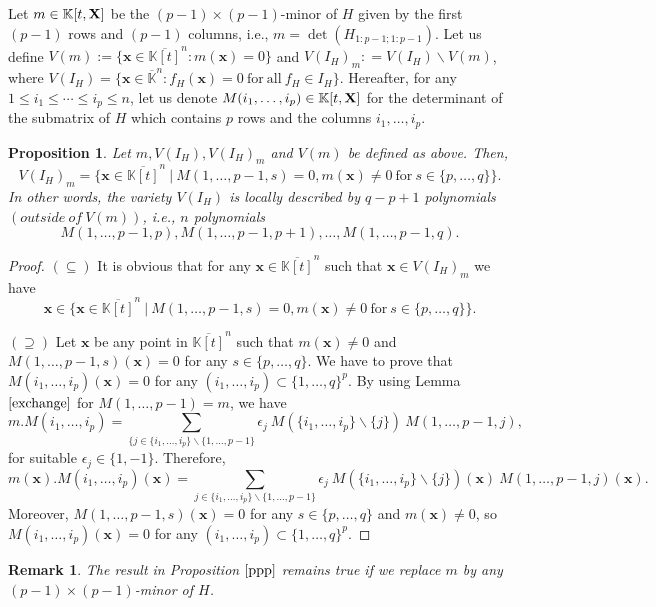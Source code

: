 \documentclass[11pt]{article}
\numberwithin{Property}{section}
\numberwithin{Theorem}{section}
\newtheorem{Proposition}{Proposition}%
\numberwithin{Proposition}{section}
\numberwithin{Lemma}{section}
\numberwithin{Corollary}{section}
\numberwithin{Definition}{section}
\newtheorem{Remark}{Remark}%
\numberwithin{Remark}{section}
\numberwithin{Conjecture}{section}
\numberwithin{Problem}{section}
\numberwithin{Example}{section}
\numberwithin{Claim}{section}
\renewcommand{\leq}{\leqslant}
\def\bar{\overline}
\newcommand{\field}{\mathbb{K}} %
\newcommand{\mat}[1]{\mathbf{\MakeUppercase{#1}}} %
\begin{document}
Let $m \in \field[t,\mat{X}]$ be the $(p-1) \times (p-1)$-minor of $H$ given by the first $(p-1)$ rows and $(p-1)$ columns, i.e., $m = \det(H_{1:p-1;1:p-1})$. Let us define $V(m) := \{\mathbf{x} \in \bar{\field[t]}^n : m(\mathbf{x}) = 0\}$ and $V(I_H)_m : = V(I_H) \backslash V(m)$, where $V(I_H) = \{\mathbf{x} \in \bar{\field}^{n} : f_H(\mathbf{x}) = 0 \ \mathrm{for \ all} \ f_H \in I_H\}$. Hereafter, for any $1 \leq i_1 \leq \cdots \leq i_p \leq n$, let us denote $M(i_1, \ldots, i_p) \in \field[t,\mat{X}]$ for the determinant of the submatrix of $H$ which contains $p$ rows and the columns $i_1, \ldots, i_p$. 
\begin{Proposition} \label{ppp} Let $m, V(I_H), V(I_H)_m$ and $V(m)$ be defined as above. Then, 
\[
V(I_H)_m = \{\mathbf{x} \in \bar{\field[t]}^n \ | \ M(1, \ldots, p-1, s) = 0, m(\mathbf{x}) \ne 0 \ \mathrm{for} \ s \in \{p, \ldots, q\} \}.
\] In other words, the variety $V(I_H)$ is locally described by $q - p + 1$ polynomials $(outside \ of \ V(m))$, i.e., $n$ polynomials 
\[
M(1, \ldots, p-1, p), M(1, \ldots, p-1, p+	1), \ldots, M(1, \ldots, p-1, q).
\]
\end{Proposition}
\begin{proof}
$(\subseteq)$ It is obvious that for any $\mathbf{x} \in \bar{\field[t]}^n$ such that $\mathbf{x} \in V(I_H)_m$ we have 
\[\mathbf{x} \in \{\mathbf{x} \in \bar{\field[t]}^n \ | \ M(1, \ldots, p-1, s) = 0, m(\mathbf{x}) \ne 0 \ \mathrm{for} \ s \in \{p, \ldots, q\} \}.\]

$(\supseteq)$ Let $\mathbf{x}$ be any point in $\bar{\field[t]}^n$ such that $m(\mathbf{x}) \ne 0$ and $M(1, \ldots, p-1, s)(\mathbf{x}) = 0$ for any $s \in \{p, \ldots, q\}$. We have to prove that $M(i_1, \ldots, i_p)(\mathbf{x}) = 0$ for any $(i_1, \ldots, i_p) \subset \{1, \ldots, q\}^p$. By using Lemma $\ref{exchange}$ for $M(1, \ldots, p-1) = m$, we have 
\[
m.M(i_1, \ldots, i_p) = \sum_{\{j \in \{i_1, \ldots, i_p\} \backslash \{1, \ldots, p-1 \} } \epsilon_j \ M(\{i_1, \ldots, i_p\} \backslash \{j\}) \ M(1, \ldots, p-1,j),
\] for suitable $\epsilon_j \in \{1,-1\}$. Therefore, 
\[
m(\mathbf{x}).M(i_1, \ldots, i_p)(\mathbf{x}) = \sum_{j \in \{i_1, \ldots, i_p\} \backslash \{1, \ldots, p-1 \} } \epsilon_j \ M(\{i_1, \ldots, i_p\} \backslash \{j\})(\mathbf{x}) \ M(1, \ldots, p-1,j)(\mathbf{x}). 
\] Moreover, $M(1, \ldots, p-1, s)(\mathbf{x}) = 0$ for any $s \in \{p, \ldots, q\}$ and $m(\mathbf{x}) \ne 0$, so $M(i_1, \ldots, i_p)(\mathbf{x}) = 0$ for any $(i_1, \ldots, i_p) \subset \{1, \ldots, q\}^p$. 
\end{proof}
\begin{Remark}The result in Proposition $\ref{ppp}$ remains true if we replace $m$ by any $(p-1) \times (p-1)$-minor of $H$. 
\end{Remark}
\end{document}
